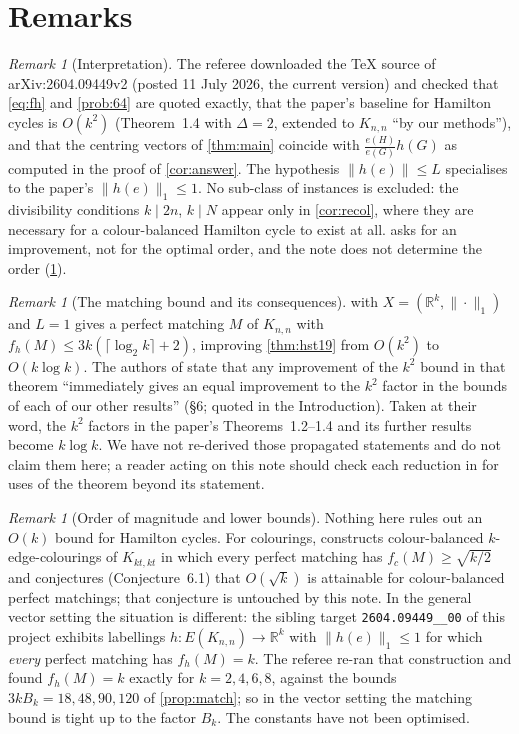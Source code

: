 \documentclass[11pt,a4paper]{article}
\theoremstyle{plain}
\theoremstyle{definition}
\theoremstyle{remark}
\newtheorem{remark}[theorem]{Remark}
\newcommand{\R}{\mathbb R}
\begin{document}
\section{Remarks}\label{sec:remarks}

\begin{remark}[Interpretation]\label{rem:interp}
The referee downloaded the TeX source of arXiv:2604.09449v2 (posted 11 July 2026, the current version) and checked that \eqref{eq:fh} and \cref{prob:64} are quoted exactly, that the paper's baseline for Hamilton cycles is $O(k^2)$ (Theorem~1.4 with $\Delta=2$, extended to $K_{n,n}$ ``by our methods''), and that the centring vectors of \cref{thm:main} coincide with $\frac{e(H)}{e(G)}h(G)$ as computed in the proof of \cref{cor:answer}. The hypothesis $\|h(e)\|\le L$ specialises to the paper's $\|h(e)\|_1\le1$. No sub-class of instances is excluded: the divisibility conditions $k\mid2n$, $k\mid N$ appear only in \cref{cor:recol}, where they are necessary for a colour-balanced Hamilton cycle to exist at all.  asks for an improvement, not for the optimal order, and the note does not determine the order (\cref{rem:order}).
\end{remark}

\begin{remark}[The matching bound and its consequences]\label{rem:propagate}
 with $X=(\R^k,\|\cdot\|_1)$ and $L=1$ gives a perfect matching $M$ of $K_{n,n}$ with $f_h(M)\le3k(\lceil\log_2k\rceil+2)$, improving \cref{thm:hst19} from $O(k^2)$ to $O(k\log k)$. The authors of \cite{HST26} state that any improvement of the $k^2$ bound in that theorem ``immediately gives an equal improvement to the $k^2$ factor in the bounds of each of our other results'' (\S6; quoted in the Introduction). Taken at their word, the $k^2$ factors in the paper's Theorems~1.2--1.4 and its further results become $k\log k$. We have not re-derived those propagated statements and do not claim them here; a reader acting on this note should check each reduction in \cite{HST26} for uses of the theorem beyond its statement.
\end{remark}

\begin{remark}[Order of magnitude and lower bounds]\label{rem:order}
Nothing here rules out an $O(k)$ bound for Hamilton cycles. For colourings, \cite{HST26} constructs colour-balanced $k$-edge-colourings of $K_{kt,kt}$ in which every perfect matching has $f_c(M)\ge\sqrt{k/2}$ and conjectures (Conjecture~6.1) that $O(\sqrt k)$ is attainable for colour-balanced perfect matchings; that conjecture is untouched by this note. In the general vector setting the situation is different: the sibling target \texttt{2604.09449\_\_00} of this project exhibits labellings $h\colon E(K_{n,n})\to\R^k$ with $\|h(e)\|_1\le1$ for which \emph{every} perfect matching has $f_h(M)=k$. The referee re-ran that construction and found $f_h(M)=k$ exactly for $k=2,4,6,8$, against the bounds $3kB_k=18,48,90,120$ of \cref{prop:match}; so in the vector setting the matching bound is tight up to the factor $B_k$. The constants have not been optimised.
\end{remark}
\end{document}
